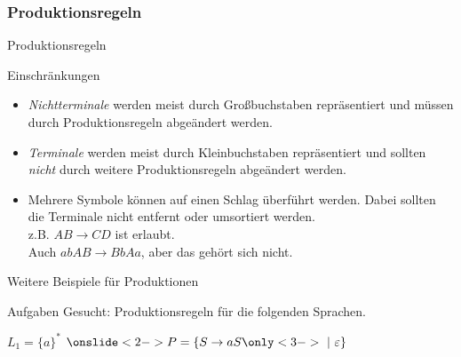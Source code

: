 \subsubsection{Produktionsregeln}
\begin{frame}{Produktionsregeln}
    \begin{alertblock}{Einschränkungen}
    \begin{itemize}
        \item \alert{\emph{Nichtterminale}} werden meist durch Großbuchstaben repräsentiert und müssen durch Produktionsregeln abgeändert werden.
        \item \alert{\emph{Terminale}} werden meist durch Kleinbuchstaben repräsentiert und sollten \emph{nicht} durch weitere Produktionsregeln abgeändert werden.
        \item Mehrere Symbole können auf einen Schlag überführt werden. Dabei sollten die Terminale nicht entfernt oder umsortiert werden.\\
        z.B. $AB \rightarrow CD$ ist erlaubt.\\
        Auch $abAB \rightarrow BbAa$, aber das gehört sich nicht.
    \end{itemize}
    \end{alertblock}
\end{frame}

\begin{frame}{Weitere Beispiele für Produktionen}
    \begin{alertblock}{Aufgaben}
    Gesucht: Produktionsregeln für die folgenden Sprachen.
    \end{alertblock}
    \begin{exampleblock}{$L_1 = \{a\}^*$}
    $\onslide<2->{P=\{S \rightarrow aS \only<3->{\ |\ \emptyWord\}}}$
    \end{exampleblock}
\end{frame}

